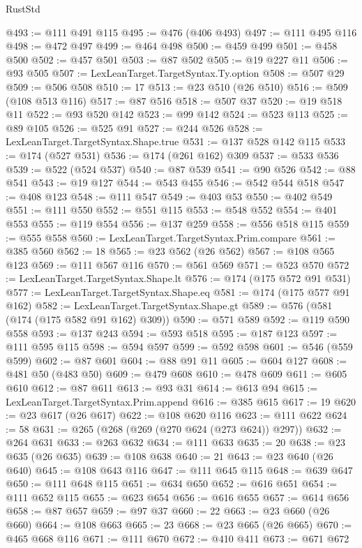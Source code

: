 \begin{lexlean}{RustStd}
\begin{coremodule}
@493 := @111 @491 @115
@495 := @476 (@406 @493)
@497 := @111 @495 @116
@498 := @472 @497
@499 := @464 @498
@500 := @459 @499
@501 := @458 @500
@502 := @457 @501
@503 := @87 @502
@505 := @19 @227 @11
@506 := @93 @505
@507 := LexLeanTarget.TargetSyntax.Ty.option
@508 := @507 @29
@509 := @506 @508
@510 := 17
@513 := @23 @510 (@26 @510)
@516 := @509 (@108 @513 @116)
@517 := @87 @516
@518 := @507 @37
@520 := @19 @518 @11
@522 := @93 @520 @142
@523 := @99 @142
@524 := @523 @113
@525 := @89 @105
@526 := @525 @91
@527 := @244 @526
@528 := LexLeanTarget.TargetSyntax.Shape.true
@531 := @137 @528 @142 @115
@533 := @174 (@527 @531)
@536 := @174 (@261 @162) @309
@537 := @533 @536
@539 := @522 (@524 @537)
@540 := @87 @539
@541 := @90 @526
@542 := @88 @541
@543 := @19 @127
@544 := @543 @455
@546 := @542 @544 @518
@547 := @408 @123
@548 := @111 @547
@549 := @403 @53
@550 := @402 @549
@551 := @111 @550
@552 := @551 @115
@553 := @548 @552
@554 := @401 @553
@555 := @119 @554
@556 := @137 @259
@558 := @556 @518 @115
@559 := @555 @558
@560 := LexLeanTarget.TargetSyntax.Prim.compare
@561 := @385 @560
@562 := 18
@565 := @23 @562 (@26 @562)
@567 := @108 @565 @123
@569 := @111 @567 @116
@570 := @561 @569
@571 := @523 @570
@572 := LexLeanTarget.TargetSyntax.Shape.lt
@576 := @174 (@175 @572 @91 @531)
@577 := LexLeanTarget.TargetSyntax.Shape.eq
@581 := @174 (@175 @577 @91 @162)
@582 := LexLeanTarget.TargetSyntax.Shape.gt
@589 := @576 (@581 (@174 (@175 @582 @91 @162) @309))
@590 := @571 @589
@592 := @119 @590 @558
@593 := @137 @243
@594 := @593 @518
@595 := @187 @123
@597 := @111 @595 @115
@598 := @594 @597
@599 := @592 @598
@601 := @546 (@559 @599)
@602 := @87 @601
@604 := @88 @91 @11
@605 := @604 @127
@608 := @481 @50 (@483 @50)
@609 := @479 @608
@610 := @478 @609
@611 := @605 @610
@612 := @87 @611
@613 := @93 @31
@614 := @613 @94
@615 := LexLeanTarget.TargetSyntax.Prim.append
@616 := @385 @615
@617 := 19
@620 := @23 @617 (@26 @617)
@622 := @108 @620 @116
@623 := @111 @622
@624 := 58
@631 := @265 (@268 (@269 (@270 @624 (@273 @624)) @297))
@632 := @264 @631
@633 := @263 @632
@634 := @111 @633
@635 := 20
@638 := @23 @635 (@26 @635)
@639 := @108 @638
@640 := 21
@643 := @23 @640 (@26 @640)
@645 := @108 @643 @116
@647 := @111 @645 @115
@648 := @639 @647
@650 := @111 @648 @115
@651 := @634 @650
@652 := @616 @651
@654 := @111 @652 @115
@655 := @623 @654
@656 := @616 @655
@657 := @614 @656
@658 := @87 @657
@659 := @97 @37
@660 := 22
@663 := @23 @660 (@26 @660)
@664 := @108 @663
@665 := 23
@668 := @23 @665 (@26 @665)
@670 := @465 @668 @116
@671 := @111 @670
@672 := @410 @411
@673 := @671 @672

\end{coremodule}
\end{lexlean}
